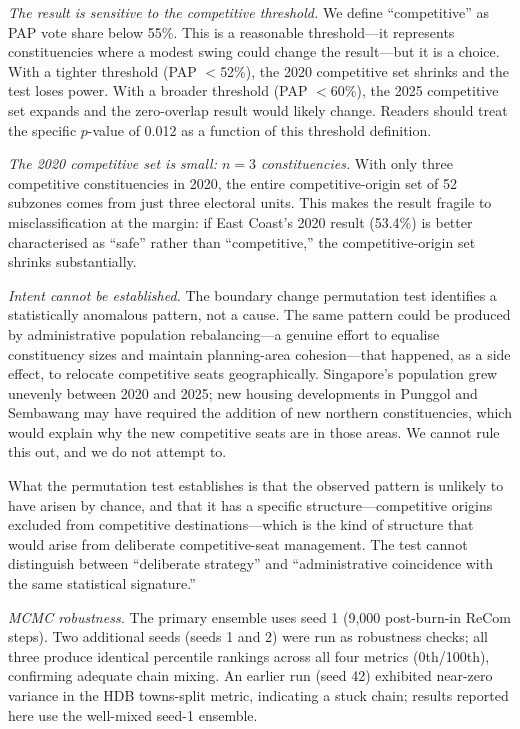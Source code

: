 \documentclass[12pt]{article}
\begin{document}
\textit{The result is sensitive to the competitive threshold.} We define ``competitive'' as PAP
vote share below 55\%. This is a reasonable threshold---it represents constituencies where a modest
swing could change the result---but it is a choice. With a tighter threshold (PAP $<$52\%), the
2020 competitive set shrinks and the test loses power. With a broader threshold (PAP $<$60\%), the
2025 competitive set expands and the zero-overlap result would likely change. Readers should treat
the specific $p$-value of 0.012 as a function of this threshold definition.

\textit{The 2020 competitive set is small: $n=3$ constituencies.} With only three competitive
constituencies in 2020, the entire competitive-origin set of 52 subzones comes from just three
electoral units. This makes the result fragile to misclassification at the margin: if East Coast's
2020 result (53.4\%) is better characterised as ``safe'' rather than ``competitive,'' the
competitive-origin set shrinks substantially.

\textit{Intent cannot be established.} The boundary change permutation test identifies a
statistically anomalous pattern, not a cause. The same pattern could be produced by administrative
population rebalancing---a genuine effort to equalise constituency sizes and maintain
planning-area cohesion---that happened, as a side effect, to relocate competitive seats
geographically. Singapore's population grew unevenly between 2020 and 2025; new housing
developments in Punggol and Sembawang may have required the addition of new northern
constituencies, which would explain why the new competitive seats are in those areas. We cannot
rule this out, and we do not attempt to.

What the permutation test establishes is that the observed pattern is unlikely to have arisen by
chance, and that it has a specific structure---competitive origins excluded from competitive
destinations---which is the kind of structure that would arise from deliberate competitive-seat
management. The test cannot distinguish between ``deliberate strategy'' and ``administrative
coincidence with the same statistical signature.''

\textit{MCMC robustness.} The primary ensemble uses seed 1 (9,000 post-burn-in ReCom steps).
Two additional seeds (seeds 1 and 2) were run as robustness checks; all three produce identical
percentile rankings across all four metrics (0th/100th), confirming adequate chain mixing. An
earlier run (seed 42) exhibited near-zero variance in the HDB towns-split metric, indicating a
stuck chain; results reported here use the well-mixed seed-1 ensemble.
\end{document}
